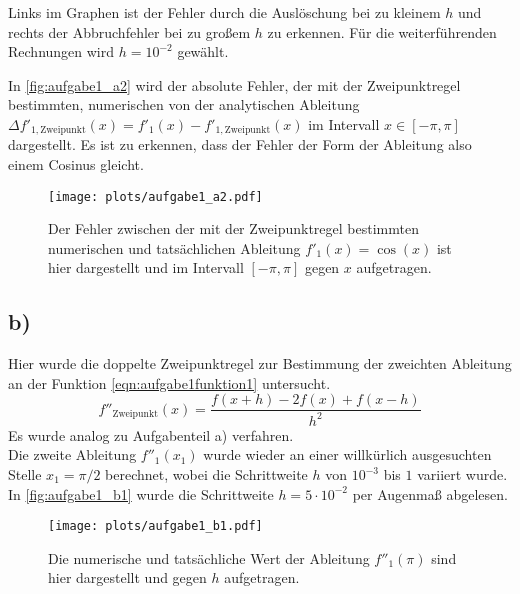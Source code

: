     Links im Graphen ist der Fehler durch die Auslöschung bei zu kleinem $h$ und rechts der Abbruchfehler bei zu großem $h$ zu erkennen.
    Für die weiterführenden Rechnungen wird $h = 10^{-2}$ gewählt.

    In \autoref{fig:aufgabe1_a2} wird der absolute Fehler, der mit der Zweipunktregel bestimmten, numerischen von der analytischen Ableitung $\Delta f'_{\mathrm{1,Zweipunkt}}(x) = f'_1(x) - f'_{\mathrm{1,Zweipunkt}}(x)$ im Intervall $x \in [-\pi, \pi]$ dargestellt.
    Es ist zu erkennen, dass der Fehler der Form der Ableitung also einem Cosinus gleicht.

    \begin{figure}[ht]
      \centering
      \texttt{[image: plots/aufgabe1\_a2.pdf]} \vspace*{-0.6cm}
      \caption{Der Fehler zwischen der mit der Zweipunktregel bestimmten numerischen und tatsächlichen Ableitung $f'_1(x) = \cos(x)$ ist hier dargestellt und im Intervall $[-\pi, \pi]$ gegen $x$ aufgetragen.}
      \label{fig:aufgabe1_a2}
    \end{figure}
    \FloatBarrier

  \subsection{b)}
    Hier wurde die doppelte Zweipunktregel zur Bestimmung der zweichten Ableitung an der Funktion \ref{eqn:aufgabe1funktion1} untersucht.
    \begin{equation}
      f''_{\mathrm{Zweipunkt}}(x) = \frac{f(x+h) - 2f(x) + f(x-h)}{h^2}
    \end{equation}
    Es wurde analog zu Aufgabenteil a) verfahren. \\
    Die zweite Ableitung $f''_1(x_1)$ wurde wieder an einer willkürlich ausgesuchten Stelle $x_1 = \pi / 2$ berechnet, wobei die Schrittweite $h$ von $10^{-3}$ bis $1$ variiert wurde.
    In \autoref{fig:aufgabe1_b1} wurde die Schrittweite $h = 5 \cdot 10^{-2}$ per Augenmaß abgelesen.
    
    \begin{figure}[H]
      \centering
      \texttt{[image: plots/aufgabe1\_b1.pdf]} \vspace*{-0.6cm}
      \caption{Die numerische und tatsächliche Wert der Ableitung $f''_1(\pi)$ sind hier dargestellt und gegen $h$ aufgetragen.}
      \label{fig:aufgabe1_b1}
    \end{figure}
    \FloatBarrier

